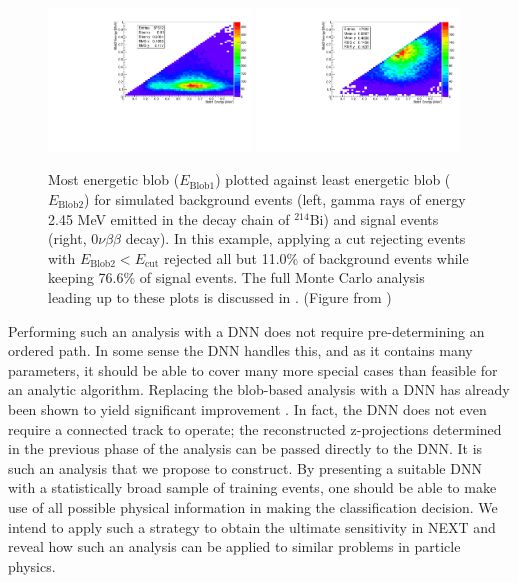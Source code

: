 \documentclass[11pt,a4paper]{article}
\begin{document}
\begin{figure}[!htb]
	\centering
	\includegraphics[width= 0.48\textwidth]{fig/blob1vsblob2_Paolina10105_Bi214.pdf}
	\includegraphics[width= 0.48\textwidth]{fig/blob1vsblob2_Paolina10105_0vbb.pdf}
	\caption{Most energetic blob ($E_{\mathrm{Blob1}}$) plotted against least energetic blob ($E_{\mathrm{Blob2}}$) for simulated background events (left, gamma rays of energy 2.45 MeV emitted in the decay chain of $^{214}$Bi) and signal events (right, $0\nu\beta\beta$ decay). In this example, applying a cut rejecting events with $E_{\mathrm{Blob2}} < E_{\mathrm{cut}}$ rejected all but 11.0\% of background events while keeping 76.6\% of signal events. The full Monte Carlo analysis leading up to these plots is discussed in \cite{NEXT_DNN}. (Figure from \cite{NEXT_DNN})} \label{fig.blobs}
\end{figure}

Performing such an analysis with a DNN does not require pre-determining an ordered path. In some sense the DNN handles this, and as it contains many parameters, it should be able to cover many more special cases than feasible for an analytic algorithm. Replacing the blob-based analysis with a DNN has already been shown to yield significant improvement \cite{NEXT_DNN}. In fact, the DNN does not even require a connected track to operate; the reconstructed z-projections determined in the previous phase of the analysis can be passed directly to the DNN. It is such an analysis that we propose to construct. By presenting a suitable DNN with a statistically broad sample of training events, one should be able to make use of all possible physical information in making the classification decision. We intend to apply such a strategy to obtain the ultimate sensitivity in NEXT and reveal how such an analysis can be applied to similar problems in particle physics.\\
\end{document}
